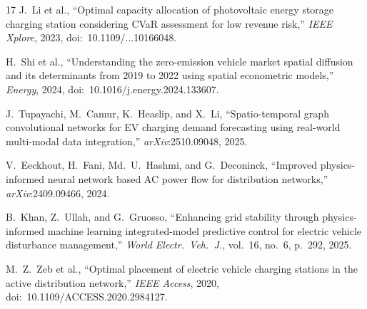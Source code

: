 \documentclass[conference]{IEEEtran}
\begin{document}
\begin{thebibliography}{17}
J.\ Li et al., ``Optimal capacity allocation of photovoltaic energy storage charging station considering CVaR assessment for low revenue risk,'' \textit{IEEE Xplore}, 2023, doi:~10.1109/...10166048.

H.\ Shi et al., ``Understanding the zero-emission vehicle market spatial diffusion and its determinants from 2019 to 2022 using spatial econometric models,'' \textit{Energy}, 2024, doi:~10.1016/j.energy.2024.133607.

J.\ Tupayachi, M.\ Camur, K.\ Heaslip, and X.\ Li, ``Spatio-temporal graph convolutional networks for EV charging demand forecasting using real-world multi-modal data integration,'' \textit{arXiv}:2510.09048, 2025.

V.\ Eeckhout, H.\ Fani, Md.~U.\ Hashmi, and G.\ Deconinck, ``Improved physics-informed neural network based AC power flow for distribution networks,'' \textit{arXiv}:2409.09466, 2024.

B.\ Khan, Z.\ Ullah, and G.\ Gruosso, ``Enhancing grid stability through physics-informed machine learning integrated-model predictive control for electric vehicle disturbance management,'' \textit{World Electr.\ Veh.\ J.}, vol.~16, no.~6, p.~292, 2025.

M.~Z.\ Zeb et al., ``Optimal placement of electric vehicle charging stations in the active distribution network,'' \textit{IEEE Access}, 2020, doi:~10.1109/ACCESS.2020.2984127.

\end{thebibliography}
\end{document}
